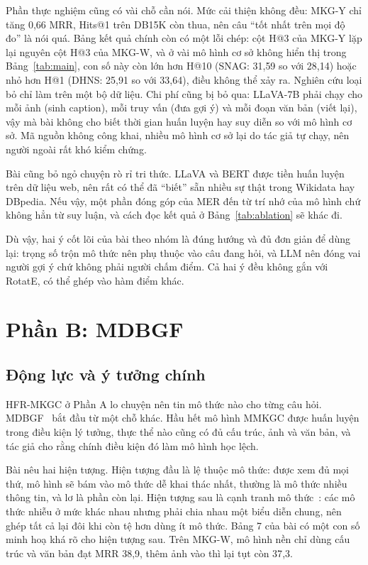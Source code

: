 \documentclass[conference,a4paper]{IEEEtran}
\begin{document}
Phần thực nghiệm cũng có vài chỗ cần nói. Mức cải thiện không đều: MKG-Y chỉ tăng 0{,}66 MRR, Hits@1 trên DB15K còn thua, nên câu ``tốt nhất trên mọi độ đo'' là nói quá. Bảng kết quả chính còn có một lỗi chép: cột H@3 của MKG-Y lặp lại nguyên cột H@3 của MKG-W, và ở vài mô hình cơ sở không hiển thị trong Bảng~\ref{tab:main}, con số này còn lớn hơn H@10 (SNAG: 31{,}59 so với 28{,}14) hoặc nhỏ hơn H@1 (DHNS: 25{,}91 so với 33{,}64), điều không thể xảy ra. Nghiên cứu loại bỏ chỉ làm trên một bộ dữ liệu. Chi phí cũng bị bỏ qua: LLaVA-7B phải chạy cho mỗi ảnh (sinh caption), mỗi truy vấn (đưa gợi ý) và mỗi đoạn văn bản (viết lại), vậy mà bài không cho biết thời gian huấn luyện hay suy diễn so với mô hình cơ sở. Mã nguồn không công khai, nhiều mô hình cơ sở lại do tác giả tự chạy, nên người ngoài rất khó kiểm chứng.

Bài cũng bỏ ngỏ chuyện rò rỉ tri thức. LLaVA và BERT được tiền huấn luyện trên dữ liệu web, nên rất có thể đã ``biết'' sẵn nhiều sự thật trong Wikidata hay DBpedia. Nếu vậy, một phần đóng góp của MER đến từ trí nhớ của mô hình chứ không hẳn từ suy luận, và cách đọc kết quả ở Bảng~\ref{tab:ablation} sẽ khác đi.

Dù vậy, hai ý cốt lõi của bài theo nhóm là đúng hướng và đủ đơn giản để dùng lại: trọng số trộn mô thức nên phụ thuộc vào câu đang hỏi, và LLM nên đóng vai người gợi ý chứ không phải người chấm điểm. Cả hai ý đều không gắn với RotatE, có thể ghép vào hàm điểm khác.

\section{Phần B: MDBGF}
\label{sec:mdbgf}

\subsection{Động lực và ý tưởng chính}
\label{sec:mdbgf-motivation}

HFR-MKGC ở Phần A lo chuyện nên tin mô thức nào cho từng câu hỏi. MDBGF~\cite{mdbgf} bắt đầu từ một chỗ khác. Hầu hết mô hình MMKGC được huấn luyện trong điều kiện lý tưởng, thực thể nào cũng có đủ cấu trúc, ảnh và văn bản, và tác giả cho rằng chính điều kiện đó làm mô hình học lệch.

Bài nêu hai hiện tượng. Hiện tượng đầu là lệ thuộc mô thức: được xem đủ mọi thứ, mô hình sẽ bám vào mô thức dễ khai thác nhất, thường là mô thức nhiều thông tin, và lơ là phần còn lại. Hiện tượng sau là cạnh tranh mô thức~\cite{modcomp}: các mô thức nhiễu ở mức khác nhau nhưng phải chia nhau một biểu diễn chung, nên ghép tất cả lại đôi khi còn tệ hơn dùng ít mô thức. Bảng 7 của bài có một con số minh hoạ khá rõ cho hiện tượng sau. Trên MKG-W, mô hình nền chỉ dùng cấu trúc và văn bản đạt MRR 38{,}9, thêm ảnh vào thì lại tụt còn 37{,}3.
\end{document}
